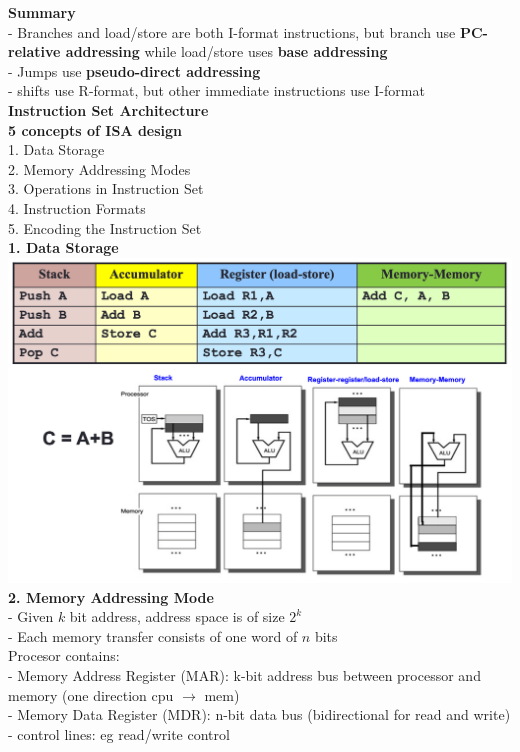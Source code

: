 \documentclass[10pt, a4paper]{article}
\begin{document}
\begin{multicols*}{3}
		\textbf{Summary}\\
		- Branches and load/store are both I-format instructions, but branch use \textbf{PC-relative addressing} while load/store uses \textbf{base addressing}\\
		- Jumps use \textbf{pseudo-direct addressing}\\
		- shifts use R-format, but other immediate instructions use I-format\\
		
		{\normalsize\textbf{Instruction Set Architecture}}\\	
		\textbf{5 concepts of ISA design}\\
		1. Data Storage\\
		2. Memory Addressing Modes\\
		3. Operations in Instruction Set\\
		4. Instruction Formats\\
		5. Encoding the Instruction Set\\
		
		\textbf{1. Data Storage}\\
		\includegraphics[scale=.25]{./assets/dataStorage}\\
		
		\textbf{2. Memory Addressing Mode}\\
		- Given $k$ bit address, address space is of size $2^k$\\
		- Each memory transfer consists of one word of $n$ bits\\
		Procesor contains:\\
		- Memory Address Register (MAR): k-bit address bus between processor and memory (one direction cpu $\rightarrow$ mem)\\
		- Memory Data Register (MDR): n-bit data bus (bidirectional for read and write)\\
		- control lines: eg read/write control\\
		

\end{multicols*}
\end{document}
